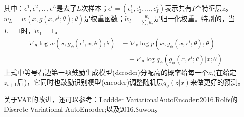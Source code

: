         其中：$\epsilon^1,\epsilon^2,\dots,\epsilon^L$是去了$L$次样本；$\epsilon^l = (\epsilon_1^l,\epsilon_2^l,\dots,\epsilon_I^l)$表示共有$I$个特征层$z$。$w_L = w(x,g(x,\epsilon^l;\theta);\theta)$是权重函数；$\tilde{w}_l = \frac{w_l}{\sum_l w_l}$是归一化权重。特别的，当$L = 1$时，$\tilde{w}_1 =1$。
        \begin{align*}
        \nabla_\theta\log w \left( x,g_\phi(\epsilon^l,x;\theta);\theta \right) &= \nabla_\theta \log p(x,g_\phi(x,\epsilon^l;\theta);\theta) \\
        &\quad - \nabla_\theta \log q_\phi (g_\phi(x,\epsilon^l;\theta)|x;\theta)
        \end{align*}
        上式中等号右边第一项鼓励生成模型(decoder)分配高的概率给每一个$z_i$(在给定$z_{i+1}$后)，它同时也鼓励识别模型(encoder)调整随机层$q_\phi(z|x)$来做更好的预测。
        \par
        关于VAE的改进，还可以参考：Laddder VariationalAutoEncoder\cite{2016.Casper};2016.Rolfe\cite{2016.Rolfe}的Discrete Variational AutoEncoder;以及2016.Suwon\cite{2016.Suwon}。
